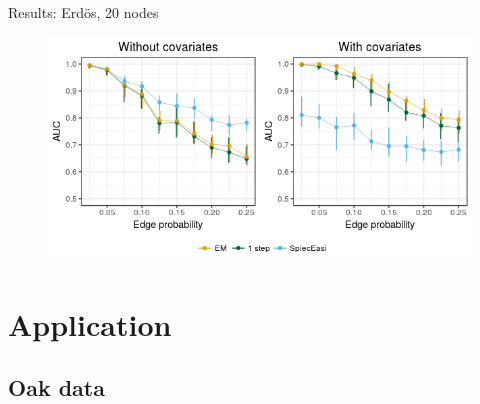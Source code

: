 \documentclass[aspectratio=169]{beamer}
\begin{document}
\begin{frame}{Results: Erdös, 20 nodes}
\begin{figure}[htp]
\centering
\includegraphics[width=13cm]{mosaic.png}
\end{figure}
\end{frame}


\section{Application}
\subsection{Oak data}

\end{document}
